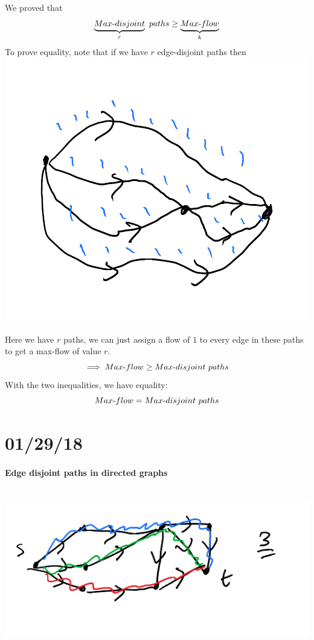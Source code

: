 \documentclass[12 pt]{article}
\begin{document}
        We proved that
        $$\underbrace{Max\hbox{-}disjoint}_r \ paths \geq
        \underbrace{Max\hbox{-}flow}_{k}$$
        To prove equality, note that if we have $r$ edge-disjoint
        paths then
        \\ \includegraphics[width=.9\textwidth]{i74.pdf}

        Here we have $r$ paths, we can just assign a flow of $1$ to
        every edge in these paths to get a max-flow of value $r$.
        $$\implies Max\hbox{-}flow \geq Max\hbox{-}disjoint \ paths$$
        With the two inequalities, we have equality:
        $$ Max \hbox{-}flow = Max\hbox{-}disjoint \ paths$$
        \section{01/29/18}
        \paragraph{Edge disjoint paths in directed graphs}
        ~ \\ \includegraphics[width=.9\textwidth]{i75.pdf}
\end{document}
